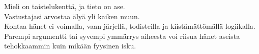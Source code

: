 \documentclass{article}
\begin{document}
\begin{infobox}
Mieli on taistelukenttä, ja tieto on ase.\\
Vastustajasi arvostaa älyä yli kaiken muun.\\
Kohtaa hänet ei voimalla, vaan järjellä, todisteilla ja kiistämättömällä logiikalla.\\
Parempi argumentti tai syvempi ymmärrys aiheesta voi riisua hänet aseista tehokkaammin kuin mikään fyysinen isku.
\end{infobox}
\end{document}
